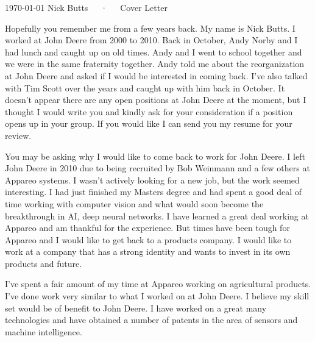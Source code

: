 \documentclass[11pt, a4paper]{awesome-cv}
\begin{document}
\makecvheader[R]

\makecvfooter
  {\today}
  {Nick Butts~~~·~~~Cover Letter}
  {}

\makelettertitle

\begin{cvletter}

Hopefully you remember me from a few years back. My name is Nick Butts. I worked at John Deere from 2000 to 2010. Back in October, Andy Norby and I had lunch and caught up on old times. Andy and I went to school together and we were in the same fraternity together. Andy told me about the reorganization at John Deere and asked if I would be interested in coming back. I've also talked with Tim Scott over the years and caught up with him back in October. It doesn't appear there are any open positions at John Deere at the moment, but I thought I would write you and kindly ask for your consideration if a position opens up in your group. If you would like I can send you my resume for your review.

You may be asking why I would like to come back to work for John Deere. I left John Deere in 2010 due to being recruited by Bob Weinmann and a few others at Appareo systems. I wasn't actively looking for a new job, but the work seemed interesting. I had just finished my Masters degree and had spent a good deal of time working with computer vision and what would soon become the breakthrough in AI, deep neural networks. I have learned a great deal working at Appareo and am thankful for the experience. But times have been tough for Appareo and I would like to get back to a products company. I would like to work at a company that has a strong identity and wants to invest in its own products and future.

I've spent a fair amount of my time at Appareo working on agricultural products. I've done work very similar to what I worked on at John Deere. I believe my skill set would be of benefit to John Deere. I have worked on a great many technologies and have obtained a number of patents in the area of sensors and machine intelligence.

\end{cvletter}


\makeletterclosing
\end{document}
